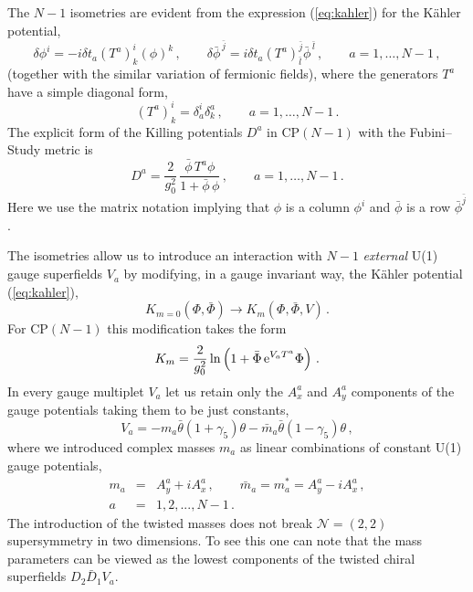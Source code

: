 \documentclass[epsfig,12pt]{article}
\def\beq{\begin{equation}}
\def\eeq{\end{equation}}
\def\beqn{\begin{eqnarray}}
\def\eeqn{\end{eqnarray}}
\def\beqn{\begin{eqnarray}}
\def\eeqn{\end{eqnarray}}
\def\beq{\begin{equation}}
\def\eeq{\end{equation}}
\newcommand{\ntwot}{${\mathcal N}= \left(2,2\right) $ }
\begin{document}
{The $N -1$ isometries are
 evident from the expression (\ref{eq:kahler}) for the K\"ahler potential, 
\begin{equation}
\label{eq:iso}
\delta\phi^{i}=-i\delta t_{a} (T^{a})^{i}_{k}(\phi)^{k}\,,\qquad 
\delta\bar\phi^{\,\bar j}=i\delta t_{a}(T^{a})^{\bar j}_{\bar l}\bar\phi^{\,\bar l}\,,
\qquad a=1,\ldots, N-1\,,
\end{equation}
(together with the similar variation of fermionic fields),
where the  generators $T^{a}$ have a simple diagonal form,
\begin{equation}
(T^{a})^{i}_{k}=\delta^{i}_{a}\delta^{a}_{k}\,, \qquad a=1,\ldots,N-1\,.
\end{equation}
 The explicit form of the Killing potentials $D^{a}$ in CP$(N\!-\!1)$ with the Fubini--Study metric is
\beq
\label{eq:KillF}
D^{a}=\frac{2}{g_{0}^{2}}\,\frac{\bar\phi\, T^{a}\phi}{1+\bar\phi\,\phi}\,,
\qquad a=1,\ldots,N-1\,.
\eeq
Here we use the matrix notation implying that $\phi$ is a column $\phi^{i}$ and 
$\bar\phi$ is a row $\bar\phi^{ \bar j}$.

The isometries allow us  to introduce an interaction with $N-1$ {\em external} 
U(1) gauge 
superfields $V_{a}$ by modifying, in a gauge invariant way,  the K\"ahler potential (\ref{eq:kahler}),
\begin{equation}
\label{eq:mkahler}
K_{m=0}(\Phi, \bar\Phi)\to
K_{m}(\Phi, \bar\Phi,V)\,.
\end{equation}
For CP$(N\!-\!1)$ this modification takes the form
\begin{equation}
\label{eq:mkahlerp}
K_{m}=\frac{2}{g_{0}^{2}}\ln \left(1+\bar\Phi\,{\rm e}^{V_{a}T^{a}}\Phi\right)\,.
\end{equation}
In every gauge multiplet $V_{a}$ let us retain only the $A^{a}_{x}$ and $A^{a}_{y}$ 
components of the gauge potentials taking them to be just constants,
\beq
V_{a}=-m_{a}\bar \theta(1+\gamma_{5})\theta -\bar m_{a}\bar \theta(1-\gamma_{5})\theta\,,
\label{wtpi1}
\end{equation}
where we introduced complex masses  $m_{a}$ as linear combinations of 
constant U(1) gauge potentials,
\beqn
m_{a}
&=&
A^{a}_{y}+iA^{a}_{x}\,,\qquad \bar m_{a}=m_{a}^{*}=A^{a}_{y}-iA^{a}_{x}\,,
\nonumber\\[2mm]
a 
&=&
 1,2, ..., N-1\,.
\label{wtpi2}
\eeqn
The introduction of the twisted masses does not 
break \ntwot supersymmetry in two dimensions.  To see this one can note that the mass parameters 
can be viewed as the lowest components of the twisted chiral superfields
$D_{2}\bar D_{1}V_{a}$.

}
\end{document}
